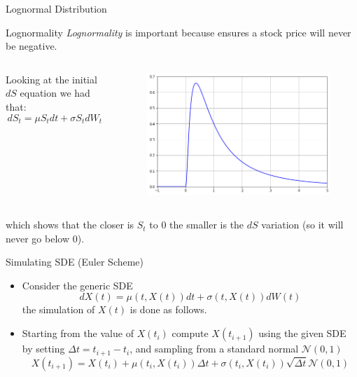 \documentclass{beamer}
\begin{document}
\begin{frame}{Lognormal Distribution}
\begin{block}{Lognormality}
  \emph{Lognormality} is important because ensures a stock price will never be negative.
  \begin{columns}
Looking at the initial $dS$ equation we had that:
\begin{equation*}
dS_t = \mu S_tdt + \sigma S_tdW_t
\end{equation*}
\begin{figure}[h]
    \begin{center}
    \includegraphics[width=0.85\linewidth]{lognormal}
    \end{center}
\end{figure}        
\end{columns}
which shows that the closer is $S_t$ to 0 the smaller is the $dS$ variation (so it will never go below 0).
\end{block}
\end{frame}

\begin{frame}{Simulating SDE (Euler Scheme)}
\begin{itemize}
\item  Consider the generic SDE
\begin{equation*}
dX(t) = \mu(t,X(t))dt + \sigma(t,X(t))dW(t)
\end{equation*}
the simulation of $X(t)$ is done as follows.
\item Starting from the value of $X(t_i)$ compute $X(t_{i+1})$ using the given SDE by setting $\Delta t = t_{i+1} - t_{i}$, and sampling from a standard normal $\mathcal{N}(0,1)$
\begin{equation*}
X(t_{i+1}) = X(t_i) + \mu(t_i,X(t_i))\Delta t + \sigma(t_i,X(t_i))\sqrt{\Delta t}\mathcal{N}(0,1)
\end{equation*}
\end{itemize}
\end{frame}
\end{document}
